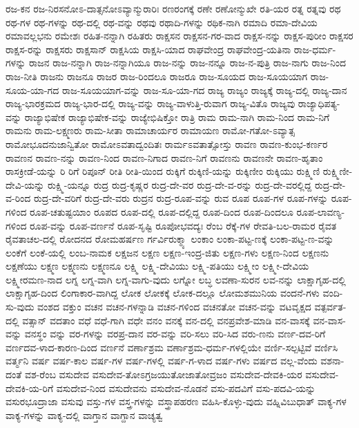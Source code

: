 {ರಜ-ಕನ
ರಜ-ನಿರಸನೋಽ-ದಾತ್ಸನೋಽವ್ಯಾನ್ಮುರಾರಿಃ
ರಣರಂಗಕ್ಕೆ
ರಣೇ
ರಣೋನ್ಮುಖೇ
ರತಿ-ಯರ
ರತ್ನ
ರತ್ನವು
ರಥ
ರಥ-ಗಳ
ರಥ-ಗಳನ್ನು
ರಥ-ದಲ್ಲಿ
ರಥ-ವನ್ನು
ರಥವು
ರಥಾದಿ-ಗಳನ್ನು
ರಥಿಕ-ನಾಗಿ
ರಮಾದಿ
ರಮಾ-ದೇವಿಯ
ರಮಾವಲ್ಲಭನು
ರಮೇಶಃ
ರಹಿತ-ನನ್ನಾಗಿ
ರಹಿತರು
ರಾಕ್ಷಸನ
ರಾಕ್ಷಸನ-ಗರ-ವಾದ
ರಾಕ್ಷಸ-ನನ್ನು
ರಾಕ್ಷಸ-ಪುರೀಂ
ರಾಕ್ಷಸರ
ರಾಕ್ಷಸ-ರನ್ನು
ರಾಕ್ಷಸರು
ರಾಕ್ಷಸಾನ್
ರಾಕ್ಷಸಿಯ
ರಾಕ್ಷಸಿ-ಯಾದ
ರಾಘವೇಂದ್ರ
ರಾಘವೇಂದ್ರ-ಯತಿನಾ
ರಾಜ-ಧರ್ಮ-ಗಳನ್ನು
ರಾಜನ
ರಾಜ-ನನ್ನಾಗಿ
ರಾಜ-ನನ್ನಾಗಿಯೂ
ರಾಜ-ನನ್ನು
ರಾಜ-ನನ್ನೂ
ರಾಜ-ನ-ಪುತ್ರಿ
ರಾಜ-ನಾಗು
ರಾಜ-ನಿಂದ
ರಾಜ-ನೀತಿ
ರಾಜನು
ರಾಜನೂ
ರಾಜರ
ರಾಜ-ರಿಂದಲೂ
ರಾಜರೂ
ರಾಜ-ಸೂಯದ
ರಾಜ-ಸೂಯಯಾಗ
ರಾಜ-ಸೂಯ-ಯಾ-ಗದ
ರಾಜ-ಸೂಯಯಾಗ-ವನ್ನು
ರಾಜ-ಸೂ-ಯಾ-ಗದ
ರಾಜ್ಯ
ರಾಜ್ಯಂ
ರಾಜ್ಯಕ್ಕೆ
ರಾಜ್ಯ-ದಲ್ಲಿ
ರಾಜ್ಯ-ದಾನ
ರಾಜ್ಯ-ಭಾರಕ್ರಮದ
ರಾಜ್ಯ-ಭಾರ-ದಲ್ಲಿ
ರಾಜ್ಯ-ವನ್ನು
ರಾಜ್ಯ-ವಾಳುತ್ತಿ-ರುವಾಗ
ರಾಜ್ಯ-ವಿತೊ
ರಾಜ್ಯವು
ರಾಜ್ಯಾಧಿಪತ್ಯ-ವನ್ನು
ರಾಜ್ಯಾಭಿಷೇಕ
ರಾಜ್ಯಾಭಿಷೇಕ-ವನ್ನು
ರಾಜ್ಯೇಭಿಷಿಕ್ತೋ
ರಾತ್ರಿ
ರಾಮ
ರಾಮ-ನಾಗಿ
ರಾಮ-ನಿಂದ
ರಾಮ-ನಿಗೆ
ರಾಮನು
ರಾಮ-ಲಕ್ಷ್ಮಣರು
ರಾಮ-ಸೀತಾ
ರಾಮಾಚಾರ್ಯರ
ರಾಮಾಯಣ
ರಾಮೋ-ಗತೋ-ಽವ್ಯಾತ್ಸ
ರಾಮೋಭೂದನುಜಾನ್ವಿತೋ
ರಾಮೋಽವತಾದ್ವಂದಿತಃ
ರಾರ್ಮಽವತಾತ್ಸೋಸ್ತು
ರಾವಣ
ರಾವಣ-ಕುಂಭ-ಕರ್ಣರ
ರಾವಣನ
ರಾವಣ-ನನ್ನು
ರಾವಣ-ನಿಂದ
ರಾವಣ-ನಿಗಾದ
ರಾವಣ-ನಿಗೆ
ರಾವಣನು
ರಾವಣನೇ
ರಾವಣ-ಹೃತಾಂ
ರಾಸಕ್ರೀಡೆ-ಯನ್ನು
ರಿ
ರಿಗೆ
ರಿಪೂನ್
ರೀತಿ
ರೀತಿ-ಯಿಂದ
ರುಕ್ಕಿಗೆ
ರುಕ್ಕಿಣಿ-ಯನ್ನು
ರುಕ್ಕಿಣೀಂ
ರುಕ್ಕಿಯು
ರುಕ್ಷ್ಮಿಣಿ
ರುಕ್ಷ್ಮಿಣೀ-ದೇವಿ-ಯನ್ನು
ರುಕ್ಷ್ಮಿ-ಯನ್ನೂ
ರುದ್ರ
ರುದ್ರ-ಕೃಷ್ಣರ
ರುದ್ರ-ದೇ-ವರ
ರುದ್ರ-ದೇ-ವ-ರನ್ನು
ರುದ್ರ-ದೇ-ವರಲ್ಲಿದ್ದ
ರುದ್ರ-ದೇ-ವ-ರಿಂದ
ರುದ್ರ-ದೇ-ವರಿಗೆ
ರುದ್ರ-ದೇ-ವರು
ರುದ್ರನ
ರುದ್ರ-ರೂಪ-ವನ್ನು
ರುವ
ರೂಪ
ರೂಪ-ಗಳ
ರೂಪ-ಗಳನ್ನು
ರೂಪ-ಗಳಿಂದ
ರೂಪ-ಚತುಷ್ಟಯಿಾಂ
ರೂಪದ
ರೂಪ-ದಲ್ಲಿ
ರೂಪ-ದಲ್ಲಿದ್ದ
ರೂಪ-ದಿಂದ
ರೂಪ-ದಿಂದಲೂ
ರೂಪ-ಲಾವಣ್ಯ-ಗಳಿಂದ
ರೂಪ-ವನ್ನು
ರೂಪ-ವರ್ಣನೆ
ರೂಪ-ಸೃಷ್ಟಿ
ರೂಪೋಭವದ್ಯಃ
ರೆಂಬ
ರೆಕ್ಕೆ-ಗಳ
ರೇವತಿ-ಬಲ-ರಾಮರ
ರೈವತ
ರೈವತಾಚಲ-ದಲ್ಲಿ
ರೋದನದ
ರೋಮಹರ್ಷಣ
ರ್ಗರ್ವಿರುಕ್ಮ್ಯಾ
ಲಂಕಾಂ
ಲಂಕಾ-ಪಟ್ಟ-ಣಕ್ಕೆ
ಲಂಕಾ-ಪಟ್ಟ-ಣ-ವನ್ನು
ಲಂಕೆಗೆ
ಲಂಕೆ-ಯಲ್ಲಿ
ಲಂಬ-ನಾಮಕ
ಲಕ್ಷಜನ
ಲಕ್ಷಣ
ಲಕ್ಷಣ-ಇಂದ್ರ-ಜಿತು
ಲಕ್ಷಣ-ಗಳು
ಲಕ್ಷಣ-ನಿಂದ
ಲಕ್ಷಣನು
ಲಕ್ಷಣೆಯು
ಲಕ್ಷ್ಮಣ
ಲಕ್ಷ್ಮಣನು
ಲಕ್ಷ್ಮಣನೂ
ಲಕ್ಷ್ಮಿ
ಲಕ್ಷ್ಮಿ-ದೇವಿಯು
ಲಕ್ಷ್ಮಿ-ಪತಿಯು
ಲಕ್ಷ್ಮೀಂ
ಲಕ್ಷ್ಮೀ-ದೇವಿಯ
ಲಕ್ಷ್ಮೀರಮಣ-ನಾದ
ಲಗ್ನ
ಲಗ್ನ-ವಾಗಿ
ಲಗ್ನ-ವಾಗು-ವುದು
ಲಗ್ನೋ
ಲಬ್ಧ
ಲವಣಾ-ಸುರನ
ಲವ-ನನ್ನು
ಲಾಕ್ಷಾಗೃಹ-ದಲ್ಲಿ
ಲಾಕ್ಷಾಗೃಹ-ದಿಂದ
ಲಿಂಗಾಕಾರ-ವಾಗಿದ್ದ
ಲೋಕ
ಲೋಕಕ್ಕೆ
ಲೋಕ-ದಲ್ಲೂ
ಲೋಮಶಮುನಿಯ
ವಂದನೆ-ಗಳು
ವಂದಿ-ಸು-ವುದು
ವಂಶದ
ವಕ್ತುಂ
ವಚನ
ವಚನ-ಗಳನ್ನಾಡಿ
ವಚನ-ಗಳಿಂದ
ವಚನತೋ
ವಚನ-ವನ್ನು
ವಟವೃಕ್ಷದ
ವತ್ಪರ್ವತ-ದಲ್ಲಿ
ವತ್ಸಾನ್
ವದತಾಂ
ವಧೆ
ವಧೆ-ಗಾಗಿ
ವಧೇ
ವನಂ
ವನಕ್ಕೆ
ವನ-ದಲ್ಲಿ
ವನಪ್ರವೇಶ-ಮಾಡಿ
ವನ-ವಾಸಕ್ಕೆ
ವನ-ವಾಸ-ವನ್ನು
ವನಸ್ಥಂ
ವನ್ನು
ವರ-ಗಳನ್ನು
ವರಪ್ರ-ದಾನ
ವರ-ವನ್ನು
ವರಿ-ಸಲು
ವರಿ-ಸಿದ
ವರು-ಣನು
ವರ್ಣ-ದವ-ರಿಗೆ
ವರ್ಣದವ-ಳಾದ-ಕಾರಣ-ದಿಂದ
ವರ್ಣನೆ
ವರ್ಣಾಶ್ರಮ
ವರ್ಣಾಶ್ರಮ-ಧರ್ಮ-ಗಳಲ್ಲಿಯೇ
ವರ್ಣಿ-ಸಲ್ಪಟ್ಟಿವೆ
ವರ್ಣಿಸಿ
ವರ್ತ್ಮನಿ
ವರ್ಷ
ವರ್ಷ-ಕಾಲ
ವರ್ಷ-ಗಳ
ವರ್ಷ-ಗಳಲ್ಲಿ
ವರ್ಷ-ಗ-ಳಾದ
ವರ್ಷ-ಗಳು
ವರ್ಷದ
ವಲ್ಲ-ವೆಂದು
ವಶನಾ-ದಂತೆ
ವಶ-ರೆಂಬ
ವಸುದೇವ
ವಸುದೇವ-ತೋಽಗ್ರಜಯುತೋಜಾತೋವ್ರಜಂ
ವಸುದೇವ-ದೇವಕಿ-ಯರ
ವಸುದೇವ-ದೇವಕಿ-ಯ-ರಿಗೆ
ವಸುದೇವ-ನಿಂದ
ವಸುದೇವನು
ವಸುದೇವ-ನೊಡನೆ
ವಸು-ಪದವಿಗೆ
ವಸು-ಪದವಿ-ಯನ್ನು
ವಸುರಭೂದ್ರಾಜಾ
ವಸುವು
ವಸ್ತು-ಗಳ
ವಸ್ತ್ರ-ಗಳನ್ನು
ವಸ್ತ್ರಾಪಹರಣ
ವಹಿಸಿ-ಕೊಳ್ಳು-ವುದು
ವಹ್ನಿವಿಬುಧಾತ್
ವಾಕ್ಯ-ಗಳ
ವಾಕ್ಯ-ಗಳನ್ನು
ವಾಕ್ಯ-ದಲ್ಲಿ
ವಾಗ್ತಾನ
ವಾಗ್ದಾನ
ವಾಚ್ಯತ್ವ
}
